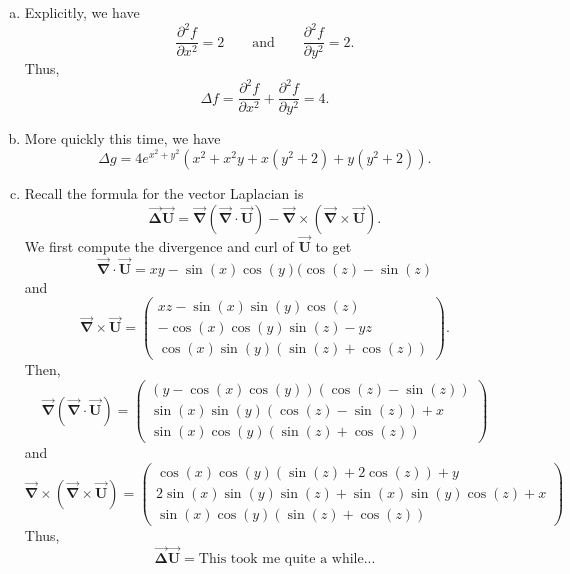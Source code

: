 \documentclass[12pt]{article} %
\newcommand{\grad}{\boldsymbol{\vec{\nabla}}}
\newcommand{\vecfieldU}{\boldsymbol{\vec{U}}}
\newcommand{\veclaplace}{\boldsymbol{\vec{\Delta}}}
\begin{document}
\begin{solution}
\begin{enumerate}[(a)]
    \item Explicitly, we have
    \[
    \frac{\partial^2f}{\partial x^2} = 2 \qquad \textrm{and} \qquad \frac{\partial^2f}{\partial y^2} = 2.
    \]
    Thus,
    \[
    \boxed{\Delta f = \frac{\partial^2f}{\partial x^2} + \frac{\partial^2f}{\partial y^2} = 4.}
    \]

    \item More quickly this time, we have
    \[
        \boxed{\Delta g = 4e^{x^2+y^2}\left(x^2+x^2y+x(y^2+2)+y(y^2+2)\right).}
    \]

    \item Recall the formula for the vector Laplacian is
    \[
    \veclaplace \vecfieldU = \grad (\grad \cdot \vecfieldU) - \grad \times (\grad \times \vecfieldU).
    \]
     We first compute the divergence and curl of $\vecfieldU$ to get
    \[
    \grad \cdot \vecfieldU = xy - \sin(x)\cos(y)(\cos(z)-\sin(z)
    \]
    and
    \[
    \grad \times \vecfieldU = \begin{pmatrix} xz - \sin(x)\sin(y)\cos(z) \\ -\cos(x)\cos(y)\sin(z) -yz \\ \cos(x)\sin(y)(\sin(z)+\cos(z)) \end{pmatrix}.
    \]
    Then,   
    \[
    \grad (\grad \cdot \vecfieldU) = \begin{pmatrix} (y-\cos(x)\cos(y))(\cos(z)-\sin(z)) \\ \sin(x)\sin(y)(\cos(z)-\sin(z))+x \\ \sin(x)\cos(y)(\sin(z)+\cos(z)) \end{pmatrix}
    \]
    and
    \[
    \grad \times (\grad \times \vecfieldU) = \begin{pmatrix} \cos(x)\cos(y)(\sin(z)+2\cos(z))+y \\ 2\sin(x)\sin(y)\sin(z)+\sin(x)\sin(y)\cos(z)+x \\ \sin(x)\cos(y)(\sin(z)+\cos(z)) \end{pmatrix}
    \]
    Thus,
    \[
    \veclaplace \vecfieldU = \textrm{This took me quite a while...}
    \]


\end{enumerate}
\end{solution}
\end{document}
